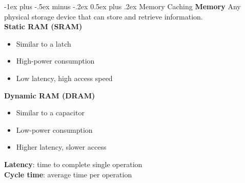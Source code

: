 \documentclass[letterpaper, 8pt]{extarticle}
\makeatletter
\renewcommand{\section}{\@startsection{section}{1}{0mm}%
                                {-1ex plus -.5ex minus -.2ex}%
                                {0.5ex plus .2ex}%
                                {\normalfont\normalsize\bfseries}}
\makeatother
\begin{document}
\begin{multicols*}{6}
    \section{Memory Caching}
	\textbf{Memory} Any physical storage device that can store and retrieve information.\\
	\textbf{Static RAM (SRAM)}\\
	\begin{itemize}
	\item Similar to a latch
	\item High-power consumption
	\item Low latency, high access speed
	\end{itemize}
	\textbf{Dynamic RAM (DRAM)}
	\begin{itemize}
	\item Similar to a capacitor
	\item Low-power consumption
	\item Higher latency, slower access
	\end{itemize}
	\textbf{Latency}: time to complete single operation\\
	\textbf{Cycle time}: average time per operation

\end{multicols*}
\end{document}
